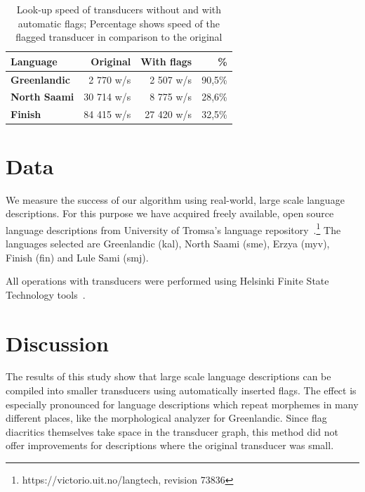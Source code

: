 \documentclass[10pt, a4paper]{article}
\begin{document}
\begin{table}[h]
 \centering
    \begin{tabular}{|l|r|r|r|}
        \hline
        \bf Language & \bf Original & \bf With flags & \bf \% \\
        \hline\hline
        \bf Greenlandic & 2 770 w/s & 2 507 w/s & 90,5\%  \\
        \bf North Saami & 30 714 w/s & 8 775 w/s & 28,6\%  \\
        \bf Finish  & 84 415 w/s & 27 420 w/s & 32,5\%  \\

        \hline
    \end{tabular}
    \caption{Look-up speed of transducers without and with automatic flags; Percentage shows speed of the flagged transducer in comparison to the original
    \label{table:lookup}}
\end{table}



\section{Data}
\label{sec:data}

We measure the success of our algorithm using real-world, large scale
language descriptions. For this purpose we have acquired freely
available, open source language descriptions from University of
Tromsa's language repository~\cite{moshagen2013building}.\footnote{https://victorio.uit.no/langtech, revision 73836} The
languages selected are Greenlandic (kal), North Saami (sme), Erzya
(myv), Finish (fin) and Lule Sami (smj).

All operations with transducers were performed using Helsinki Finite
State Technology tools~\cite{linden2011}.



\section{Discussion}
\label{sec:discussion}

The results of this study show that large scale language descriptions
can be compiled into smaller transducers using automatically inserted
flags. The effect is especially pronounced for language descriptions
which repeat morphemes in many different places, like the
morphological analyzer for Greenlandic. Since flag diacritics
themselves take space in the transducer graph, this method did not
offer improvements for descriptions where the original
transducer was small.
\end{document}
